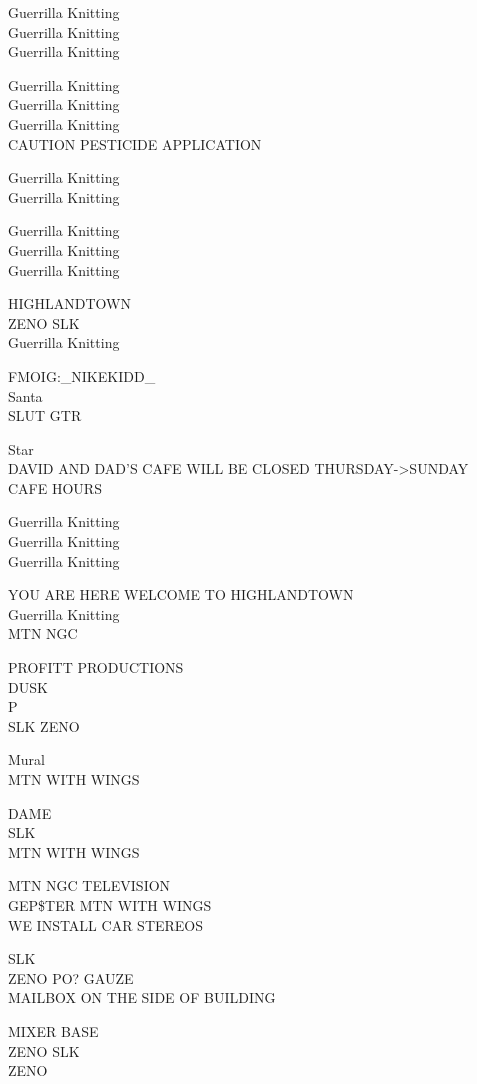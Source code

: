 \documentclass[10pt,letterpaper]{article}
\begin{document}
Guerrilla Knitting\\
Guerrilla Knitting\\
Guerrilla Knitting

Guerrilla Knitting\\
Guerrilla Knitting\\
Guerrilla Knitting\\
CAUTION PESTICIDE APPLICATION

Guerrilla Knitting\\
Guerrilla Knitting

Guerrilla Knitting\\
Guerrilla Knitting\\
Guerrilla Knitting

HIGHLANDTOWN\\
ZENO SLK\\
Guerrilla Knitting

FMOIG:\_NIKEKIDD\_\\
Santa\\
SLUT GTR

Star\\
DAVID AND DAD'S CAFE WILL BE CLOSED THURSDAY{-}>SUNDAY\\
CAFE HOURS

Guerrilla Knitting\\
Guerrilla Knitting\\
Guerrilla Knitting

YOU ARE HERE WELCOME TO HIGHLANDTOWN\\
Guerrilla Knitting\\
MTN NGC

PROFITT PRODUCTIONS\\
DUSK\\
P\\
SLK ZENO

Mural\\
MTN WITH WINGS

DAME\\
SLK\\
MTN WITH WINGS

MTN NGC TELEVISION\\
GEP\$TER MTN WITH WINGS\\
WE INSTALL CAR STEREOS

SLK\\
ZENO PO? GAUZE\\
MAILBOX ON THE SIDE OF BUILDING

MIXER BASE\\
ZENO SLK\\
ZENO
\end{document}
